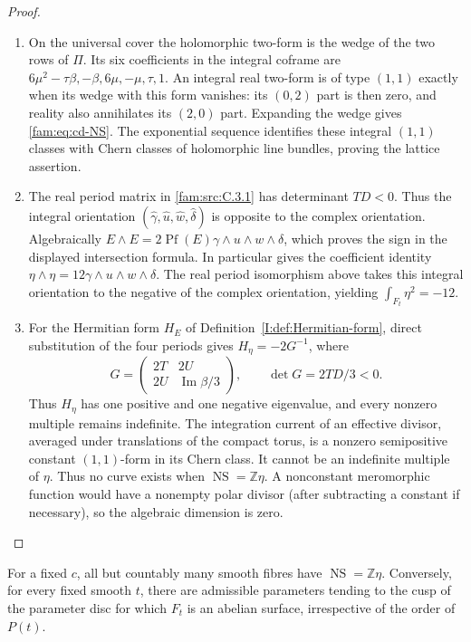 \begin{proof}
\begin{enumerate}[label=\arabic*.,leftmargin=*]
\item On the universal cover the holomorphic two-form is the wedge of the two
rows of \(\Pi\). Its six coefficients in the integral coframe are
\(6\mu^2-\tau\beta,-\beta,6\mu,-\mu,\tau,1\).
An integral real two-form is of type \((1,1)\) exactly when its wedge
with this form vanishes: its \((0,2)\) part is then zero, and reality
also annihilates its \((2,0)\) part. Expanding the wedge gives
\eqref{fam:eq:cd-NS}. The exponential sequence identifies these integral
\((1,1)\) classes with Chern classes of holomorphic line bundles, proving
the lattice assertion.

\item The real period matrix in \ref{fam:src:C.3.1} has determinant \(TD<0\). Thus the
integral orientation \((\widehat\gamma,\widehat u,\widehat w,
\widehat\delta)\) is opposite to the complex orientation. Algebraically
\(E\wedge E=2\operatorname{Pf}(E)\gamma\wedge u\wedge w\wedge\delta\),
which proves the sign in the displayed intersection formula. In
particular \cite[Lemma~9.4, pp.~66--67]{AC2026} gives the coefficient
identity \(\eta\wedge\eta=12\gamma\wedge u\wedge w\wedge\delta\).
The real period isomorphism above takes this integral orientation to the
negative of the complex orientation, yielding
\(\int_{F_t}\eta^2=-12\).

\item For the Hermitian form $H_E$ of Definition~\ref{I:def:Hermitian-form}, direct
substitution of the four periods gives $H_\eta=-2G^{-1}$, where
\[
 G=\begin{pmatrix}2T&2U\\2U&\operatorname{Im}\beta/3\end{pmatrix},
 \qquad \det G=2TD/3<0.
\]
Thus $H_\eta$ has one positive and one negative eigenvalue, and every
nonzero multiple remains indefinite. The integration
current of an effective divisor, averaged under translations of the
compact torus, is a nonzero semipositive constant \((1,1)\)-form in its
Chern class. It cannot be an indefinite multiple of \(\eta\).
Thus no curve exists when \(\operatorname{NS}=\mathbb Z\eta\).
A nonconstant meromorphic function would have a nonempty polar divisor
(after subtracting a constant if necessary), so the algebraic dimension
is zero.
\end{enumerate}
\end{proof}

\begin{proposition}\hypertarget{tag-01QV}{}\label{fam:src:D.1.5}\label{fam:st:D.1.5}

For a fixed \(c\), all but countably many smooth fibres have
\(\operatorname{NS}=\mathbb Z\eta\). Conversely, for every fixed smooth
\(t\), there are admissible parameters tending to the cusp of the
parameter disc for which \(F_t\) is an abelian surface, irrespective of
the order of \(P(t)\).
\end{proposition}


